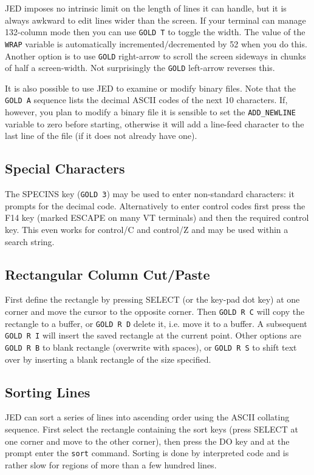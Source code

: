JED imposes no intrinsic limit on the length of lines it can handle, but
it is always awkward to edit lines wider than the screen. If your
terminal can manage 132-column mode then you can use {\tt GOLD T} to
toggle the width. The value of the {\tt WRAP} variable is automatically
incremented/decremented by 52 when you do this. Another option is to use
{\tt GOLD} right-arrow to scroll the screen sideways in chunks of half a
screen-width.  Not surprisingly the {\tt GOLD} left-arrow reverses this.

It is also possible to use JED to examine or modify binary files.  Note
that the {\tt GOLD A} sequence lists the decimal ASCII codes of the next
10 characters.  If, however, you plan to modify a binary file it is
sensible to set the {\tt ADD\_NEWLINE} variable to zero before starting,
otherwise it will add a line-feed character to the last line of the file
(if it does not already have one).

\subsection{Special Characters}

The SPECINS key ({\tt GOLD 3}) may be used to enter non-standard characters: it
prompts for the decimal code.  Alternatively to enter control codes first
press the F14 key (marked ESCAPE on many VT terminals) and then the
required control key.  This even works for control/C and control/Z and
may be used within a search string.

\subsection{Rectangular Column Cut/Paste}

First define the rectangle by pressing SELECT (or the key-pad dot key) at
one corner and move the cursor to the opposite corner.  Then {\tt GOLD R
C} will copy the rectangle to a buffer, or {\tt GOLD R D} delete it, i.e.
move it to a buffer.  A subsequent {\tt GOLD R I} will insert the saved
rectangle at the current point.  Other options are {\tt GOLD R B} to
blank rectangle (overwrite with spaces), or {\tt GOLD R S}
to shift text over by inserting a blank rectangle of the size specified.

\subsection{Sorting Lines}

JED can sort a series of lines into ascending order using the ASCII
collating sequence.  First select the rectangle containing the sort keys
(press SELECT at one corner and move to the other corner), then press the
DO key and at the prompt enter the {\tt sort} command. Sorting is done by
interpreted code and is rather slow for regions of more than a few
hundred lines.

